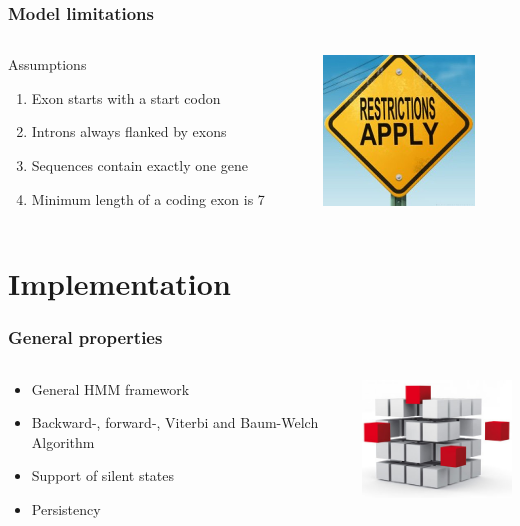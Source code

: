 \documentclass{beamer}[12pt]
\begin{document}
\begin{frame}
	\frametitle{Model limitations}
	\begin{columns}
		\begin{column}{6.5cm}
			Assumptions
			\begin{enumerate}
				\item Exon starts with a start codon
				\item Introns always flanked by exons
				\item Sequences contain exactly one gene
				\item Minimum length of a coding exon is 7
			\end{enumerate}
		\end{column}
		\begin{column}{4.5cm}
			\includegraphics[width=4cm]{../picturesforthepresentation/restrictions.jpg}
		\end{column}
	\end{columns}
\end{frame}

\section{Implementation}

\begin{frame}
	\frametitle{General properties}
	\begin{columns}
		\begin{column}{6cm}
			\begin{itemize}
				\item General HMM framework
				\item Backward-, forward-, Viterbi and Baum-Welch Algorithm
				\item Support of silent states
				\item Persistency
			\end{itemize}
		\end{column}
		\begin{column}{5cm}
			\includegraphics[width=4.5cm]{../picturesforthepresentation/features.jpg}
		\end{column}
	\end{columns}
\end{frame}
\end{document}
